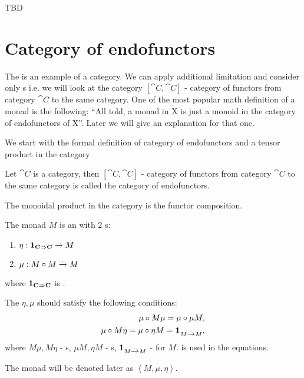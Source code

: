 \begin{definition}
  \label{def:tensor_product}
  TBD
\end{definition}


\section{Category of endofunctors}

The  is an example of a category. We can
apply additional limitation and consider only
s i.e. we will look at the category
$[\cat{C}, \cat{C}]$ - category of functors from category $\cat{C}$ to
the same category. One of the most popular math definition of a monad
is the following: 
``All told, a monad in X is just a monoid in the category of
endofunctors of X''\cite{bib:maclane71}.
Later we will give an explanation for that one.

We start with the formal definition of category of endofunctors and a
tensor product in the category
\begin{definition}
\label{def:category_of_endofunctors}
Let $\cat{C}$ is a category, then $[\cat{C}, \cat{C}]$ - category of
functors from category $\cat{C}$ to the same category is called the
category of endofunctors.

The monoidal product in the category is the functor composition.
\end{definition}

\begin{definition}[Monad]
  \label{def:monad}
  The monad $M$ is an  with 2
  s:
  \begin{enumerate}
  \item $\eta: \mathbf{1}_{ \mathbf{C} \Rightarrow \mathbf{C} } \xrightarrow{.} M$
  \item $\mu: M \circ M \xrightarrow{.} M$
  \end{enumerate}
  where $\mathbf{1}_{ \mathbf{C} \Rightarrow \mathbf{C} }$ is .

  The $\eta, \mu$ should satisfy the following conditions:
  \begin{eqnarray}
    \mu \circ M \mu = \mu \circ \mu M, 
    \nonumber \\
    \mu \circ M \eta = \mu \circ \eta M = \mathbf{1}_{ M \xrightarrow{.} M },
    \label{eq:monad}
  \end{eqnarray}
  where $M \mu, M \eta$ - s, $\mu M, \eta M$ -
  s, $\mathbf{1}_{ M \xrightarrow{.} M }$ -  for $M$.
   is used in the equations.

  The monad will be denoted later as $\left<M, \mu, \eta\right>$.
\end{definition}

